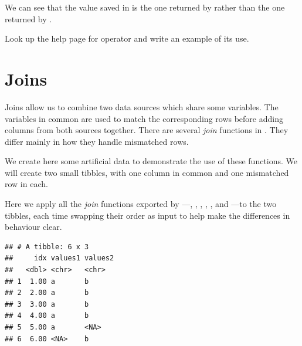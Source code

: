 \documentclass[krantz2,ChapterTOCs]{krantz}\usepackage{knitr}
\begin{document}
We can see that the value saved in  is the one returned by  rather than the one returned by .

\begin{playground}
Look up the help page for operator \Roperator{\%\$\%} and write an example of its use.
\end{playground}

\section{Joins}

Joins allow us to combine two data sources which share some variables. The variables in common are used to match the corresponding rows before adding columns from both sources together. There are several \emph{join} functions in . They differ mainly in how they handle mismatched rows.

We create here some artificial data to demonstrate the use of these functions. We will create two small tibbles, with one column in common and one mismatched row in each.

\begin{knitrout}\footnotesize
{}\color{fgcolor}\begin{kframe}
\begin{alltt}
 \hlkwb{<-} \hlstd{(} \hlstd{=} \hlstd{(}\hlopt{:}\hlstd{,} \hlstd{),}  \hlstd{=} \hlstd{)}
 \hlkwb{<-} \hlstd{(} \hlstd{=} \hlstd{(}\hlopt{:}\hlstd{,} \hlstd{),}  \hlstd{=} \hlstd{)}
\end{alltt}
\end{kframe}
\end{knitrout}

Here we apply all the \emph{join} functions exported by ---, , , , , and ---to the two tibbles, each time swapping their order as input to help make the differences in behaviour clear.

\begin{knitrout}\footnotesize
{}\color{fgcolor}\begin{kframe}
\begin{alltt}
\end{alltt}


{\ttfamily\noindent\itshape{}}\begin{verbatim}
## # A tibble: 6 x 3
##     idx values1 values2
##   <dbl> <chr>   <chr>  
## 1  1.00 a       b      
## 2  2.00 a       b      
## 3  3.00 a       b      
## 4  4.00 a       b      
## 5  5.00 a       <NA>   
## 6  6.00 <NA>    b
\end{verbatim}
\end{kframe}
\end{knitrout}
\end{document}
